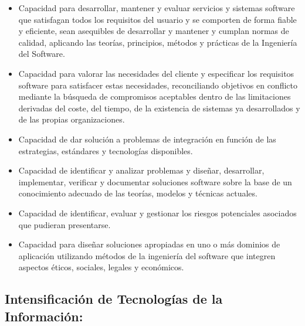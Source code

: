 \documentclass{pre-tfg}
\begin{document}
\begin{itemize}
\item Capacidad para desarrollar, mantener y evaluar servicios y sistemas software que
  satisfagan todos los requisitos del usuario y se comporten de forma fiable y eficiente,
  sean asequibles de desarrollar y mantener y cumplan normas de calidad, aplicando las
  teorías, principios, métodos y prácticas de la Ingeniería del Software.
\item Capacidad para valorar las necesidades del cliente y especificar los requisitos
  software para satisfacer estas necesidades, reconciliando objetivos en conflicto
  mediante la búsqueda de compromisos aceptables dentro de las limitaciones derivadas del
  coste, del tiempo, de la existencia de sistemas ya desarrollados y de las propias
  organizaciones.
\item Capacidad de dar solución a problemas de integración en función de las estrategias,
  estándares y tecnologías disponibles.
\item Capacidad de identificar y analizar problemas y diseñar, desarrollar, implementar,
  verificar y documentar soluciones software sobre la base de un conocimiento adecuado de
  las teorías, modelos y técnicas actuales.
\item Capacidad de identificar, evaluar y gestionar los riesgos potenciales asociados que pudieran presentarse.
\item Capacidad para diseñar soluciones apropiadas en uno o más dominios de aplicación
  utilizando métodos de la ingeniería del software que integren aspectos éticos, sociales,
  legales y económicos.
\end{itemize}


\subsection*{Intensificación de Tecnologías de la Información:}
\end{document}
